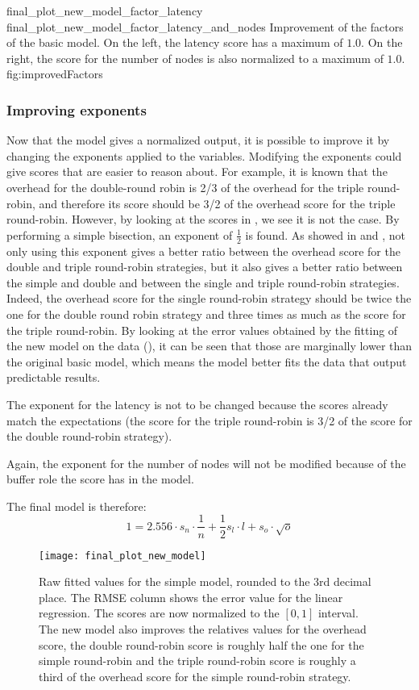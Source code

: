 \doublefigure
    {final_plot_new_model_factor_latency}
    {final_plot_new_model_factor_latency_and_nodes}
    {Improvement of the factors of the basic model. On the left, the latency
    score has a maximum of \(1.0\). On the right, the score for the number of nodes
    is also normalized to a maximum of \(1.0\).}
    {fig:improvedFactors}


\subsubsection{Improving exponents}
Now that the model gives a normalized output, it is possible to improve it by
changing the exponents applied to the variables. Modifying the exponents could
give scores that are easier to reason about. For example, it is known that the
overhead for the double-round robin is 2/3 of the overhead for the triple
round-robin, and therefore its score should be 3/2 of the overhead score for the
triple round-robin. However, by looking at the scores in ,
we see it is not the case. 
By performing a simple bisection, an exponent of \(\frac{1}{2}\) is found. As
showed in  and , not only using this exponent gives a better ratio
between the overhead score for the double and triple round-robin strategies, but
it also gives a better ratio between the simple and double and between the
single and triple round-robin strategies. Indeed, the overhead score for the
single round-robin strategy should be twice the one for the double round robin
strategy and three times as much as the score for the triple round-robin.
By looking at the error values obtained by the fitting of the new model on the
data (), it can be seen that those are marginally lower than the original basic
model, which means the model better fits the data that output predictable
results. 

The exponent for the latency is not to be changed because the scores already
match the expectations (the score for the triple round-robin is 3/2 of the score
for the double round-robin strategy). 

Again, the exponent for the number of nodes will not be modified because of the
buffer role the score has in the model.

The final model is therefore: 
\[1 = 2.556\cdot s_n \cdot \frac{1}{n} + \frac{1}{2} s_l\cdot l + s_o\cdot
\sqrt{o}\]

\begin{figure}[h]
    \centering
    \texttt{[image: final\_plot\_new\_model]}
    \caption{Raw fitted values for the simple model, rounded to the 3rd
        decimal place. The RMSE column shows the error value for the linear
        regression. The scores are now normalized to the \([0, 1]\)
        interval. The new model also improves the relatives values for the
        overhead score, the double round-robin score is roughly half the one for
        the simple round-robin and the triple round-robin score is roughly a
        third of the overhead score for the simple round-robin strategy.}
    \label{fig:recapTestsPlotNew}
\end{figure}

